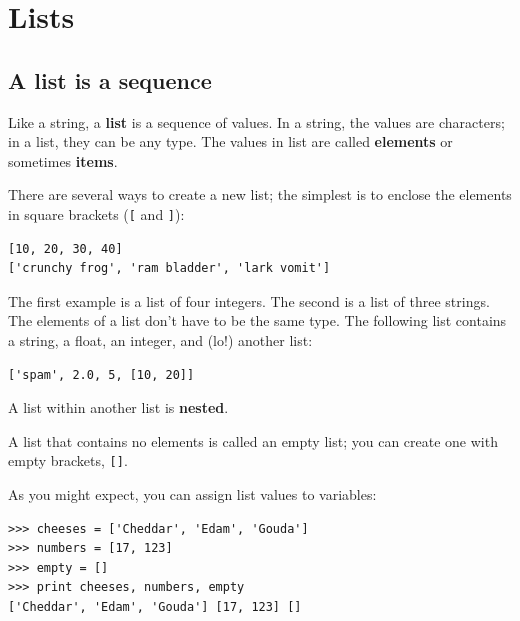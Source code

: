 \documentclass[10pt]{book}
\begin{document}
\chapter{Lists}



\section{A list is a sequence}

Like a string, a {\bf list} is a sequence of values.  In a string, the
values are characters; in a list, they can be any type.  The values in
list are called {\bf elements} or sometimes {\bf items}.


There are several ways to create a new list; the simplest is to
enclose the elements in square brackets (\verb"[" and \verb"]"):

\beforeverb
\begin{verbatim}
[10, 20, 30, 40]
['crunchy frog', 'ram bladder', 'lark vomit']
\end{verbatim}
\afterverb
%
The first example is a list of four integers.  The second is a list of
three strings.  The elements of a list don't have to be the same type.
The following list contains a string, a float, an integer, and
(lo!) another list:

\beforeverb
\begin{verbatim}
['spam', 2.0, 5, [10, 20]]
\end{verbatim}
\afterverb
%
A list within another list is {\bf nested}.


A list that contains no elements is
called an empty list; you can create one with empty
brackets, \verb"[]".


As you might expect, you can assign list values to variables:

\beforeverb
\begin{verbatim}
>>> cheeses = ['Cheddar', 'Edam', 'Gouda']
>>> numbers = [17, 123]
>>> empty = []
>>> print cheeses, numbers, empty
['Cheddar', 'Edam', 'Gouda'] [17, 123] []
\end{verbatim}
\afterverb
%


\end{document}
